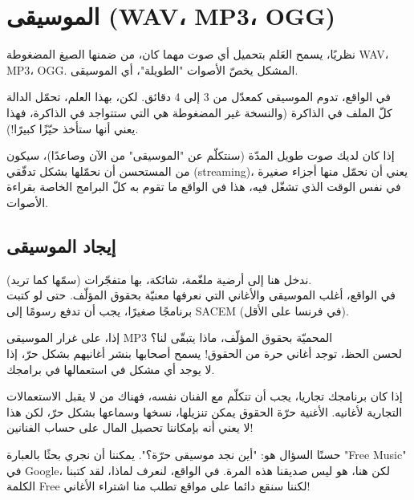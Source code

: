 \section{الموسيقى (\textenglish{WAV}، \textenglish{MP3}، \textenglish{OGG})}

نظريًا، يسمح العَلم
بتحميل أي صوت مهما كان، من ضمنها الصيغ المضغوطة
\textenglish{WAV}، \textenglish{MP3}، \textenglish{OGG}.
 المشكل يخصّ الأصوات "الطويلة"، أي الموسيقى.
 
في الواقع، تدوم الموسيقى كمعدّل من 3 إلى 4 دقائق. لكن، بهذا العلم، تحمّل الدالة\\
كلّ الملف في الذاكرة (والنسخة غير المضغوطة هي التي ستتواجد في الذاكرة، فهذا يعني أنها ستأخذ حيّزًا كبيرًا!).

إذا كان لديك صوت طويل المدّة (سنتكلّم عن "الموسيقى" من الآن وصاعدًا)، سيكون من المستحسن أن نحمّلها بشكل تدفّقي
(\textenglish{streaming})،
يعني أن نحمّل منها أجزاء صغيرة في نفس الوقت الذي تشغّل فيه، هذا في الواقع ما تقوم به كلّ البرامج الخاصة بقراءة الأصوات.

\subsection{إيجاد الموسيقى}

ندخل هنا إلى أرضية ملغّمة، شائكة، بها متفجّرات (سمّها كما تريد).\\
في الواقع، أغلب الموسيقى والأغاني التي نعرفها معنيّة بحقوق المؤلّف. حتى لو كتبت برنامجًا صغيرًا، يجب أن تدفع رسومًا إلى \textenglish{SACEM}
(في فرنسا على الأقل).

إذا، على غرار الموسيقى
\textenglish{MP3}
المحميّة بحقوق المؤلّف، ماذا يتبقّى لنا؟\\
لحسن الحظ، توجد أغاني حرة من الحقوق! يسمح أصحابها بنشر أغانيهم بشكل حرّ، إذا لا يوجد أي مشكل في استعمالها في برامجك.

\begin{warning}
إذا كان برنامجك تجاريا، يجب أن تتكلّم مع الفنان نفسه، فهناك من لا يقبل الاستعمالات التجارية لأغانيه. الأغنية حرّة الحقوق يمكن تنزيلها، نسخها وسماعها بشكل حرّ، لكن هذا لا يعني أنه بإمكاننا تحصيل المال على حساب الفنانين!
\end{warning}

حسنًا السؤال هو: "أين نجد موسيقى حرّة؟". يمكننا أن نجري بحثًا بالعبارة
"\textenglish{Free Music}"
في
\textenglish{Google}،
لكن هنا، هو ليس صديقنا هذه المرة. في الواقع، لنعرف لماذا، لقد كتبنا الكلمة
\textenglish{Free}
لكننا سنقع دائما على مواقع تطلب منا اشتراء الأغاني!

